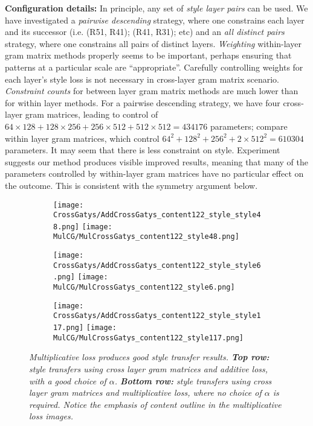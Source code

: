 \documentclass[runningheads]{llncs}
\begin{document}
{\bf Configuration details:}  In principle, any set of {\em style layer pairs} can be used.  We have investigated a {\em pairwise descending}
strategy, where one constrains each layer and its successor (i.e. (R51, R41); (R41, R31); etc) and an {\em all distinct pairs}
strategy, where one constrains all pairs of distinct layers.  {\em Weighting} within-layer gram matrix methods properly
seems to be important, perhaps ensuring that patterns at a particular scale are ``appropriate''.   Carefully controlling
weights for each layer's style loss is not necessary in cross-layer gram matrix scenario.    {\em Constraint counts} for 
between layer gram matrix methods are much lower than for within layer methods.  For a pairwise descending strategy, 
we have four cross-layer gram matrices, leading to  control of $64\times
128+128\times 256+256\times 512+512\times 512 = 434176 $ parameters; compare within layer gram matrices, which control 
$64^2+128^2+256^2+2\times512^2 = 610304$ parameters.  It may seem that there is less constraint on style.  Experiment
suggests our method produces visible improved results, meaning that many of the parameters controlled by within-layer
gram matrices have no particular effect on the outcome.   This is consistent with the symmetry argument below.




\begin{figure}[!htbp]
\centering
\small 
\begin{subfigure}[t]{0.3\linewidth}
    \texttt{[image: CrossGatys/AddCrossGatys\_content122\_style\_style48.png]}
    \texttt{[image: MulCG/MulCrossGatys\_content122\_style48.png]}
\end{subfigure}
\begin{subfigure}[t]{0.3\linewidth}
    \texttt{[image: CrossGatys/AddCrossGatys\_content122\_style\_style6.png]}
    \texttt{[image: MulCG/MulCrossGatys\_content122\_style6.png]}
\end{subfigure}
\begin{subfigure}[t]{0.3\linewidth}
    \texttt{[image: CrossGatys/AddCrossGatys\_content122\_style\_style117.png]} 
    \texttt{[image: MulCG/MulCrossGatys\_content122\_style117.png]}
\end{subfigure}

\caption{\em 
 Multiplicative loss produces good style transfer results.
{\bf Top row:} style transfers using cross layer gram matrices and additive loss, with a good choice of $\alpha$. {\bf
  Bottom row:} style transfers using cross layer gram matrices and multiplicative loss, where no choice of $\alpha$ is required. Notice the emphasis of  content outline in the multiplicative loss images. 
}
  \label{fig:MulCG}
\end{figure}
\end{document}
